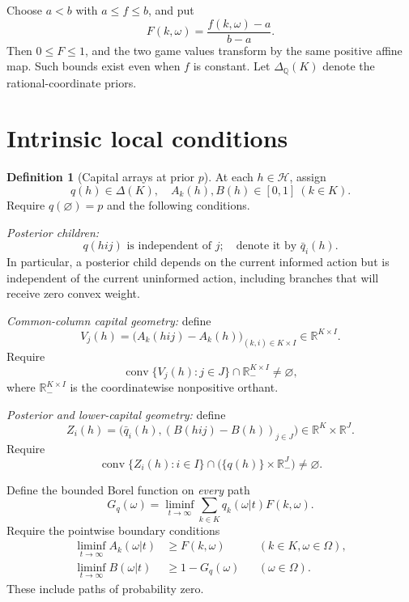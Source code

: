 \documentclass[11pt,a4paper]{article}
\theoremstyle{definition}
\newtheorem{definition}[theorem]{Definition}
\newcommand{\R}{\mathbb R}
\newcommand{\HH}{\mathcal H}
\newcommand{\co}{\operatorname{conv}}
\begin{document}
Choose $a<b$ with $a\leq f\leq b$, and put
\[
 F(k,\omega)=\frac{f(k,\omega)-a}{b-a}.
\]
Then $0\leq F\leq1$, and the two game values transform by the same
positive affine map. Such bounds exist even when $f$ is constant. Let
$\Delta_{\mathbb Q}(K)$ denote the rational-coordinate priors.

\section{Intrinsic local conditions}

\begin{definition}[Capital arrays at prior $p$]
At each $h\in\HH$, assign
\[
 q(h)\in\Delta(K),\quad
 A_k(h),B(h)\in[0,1]\ (k\in K).
\]
Require $q(\varnothing)=p$ and the following conditions.

\emph{Posterior children:}
\begin{equation}
 q(hij)\text{ is independent of }j;
 \quad\text{denote it by }\bar q_i(h).
 \tag{BF}\label{bf}
\end{equation}
In particular, a posterior child depends on the current informed action
but is independent of the current uninformed action, including branches
that will receive zero convex weight.

\emph{Common-column capital geometry:} define
\[
 V_j(h)=\bigl(A_k(hij)-A_k(h)\bigr)_{(k,i)\in K\times I}
 \in\R^{K\times I}.
\]
Require
\begin{equation}
 \co\{V_j(h):j\in J\}\cap\R_{-}^{K\times I}\ne\varnothing,
 \tag{UC}\label{uc}
\end{equation}
where $\R_{-}^{K\times I}$ is the coordinatewise nonpositive orthant.

\emph{Posterior and lower-capital geometry:} define
\[
 Z_i(h)=\bigl(\bar q_i(h),
        (B(hij)-B(h))_{j\in J}\bigr)\in\R^K\times\R^J.
\]
Require
\begin{equation}
 \co\{Z_i(h):i\in I\}\cap
        \bigl(\{q(h)\}\times\R_-^J\bigr)\ne\varnothing.
 \tag{LC}\label{lc}
\end{equation}

Define the bounded Borel function on \emph{every} path
\begin{equation}
 G_q(\omega)=\liminf_{t\to\infty}
       \sum_{k\in K}q_k(\omega|t)F(k,\omega).
 \tag{G}\label{g}
\end{equation}
Require the pointwise boundary conditions
\begin{align}
 \liminf_{t\to\infty}A_k(\omega|t)&\geq F(k,\omega)
       &&(k\in K,\omega\in\Omega),\tag{UB}\label{ub}\\
 \liminf_{t\to\infty}B(\omega|t)&\geq1-G_q(\omega)
       &&(\omega\in\Omega).\tag{LB}\label{lb}
\end{align}
These include paths of probability zero.
\end{definition}
\end{document}
